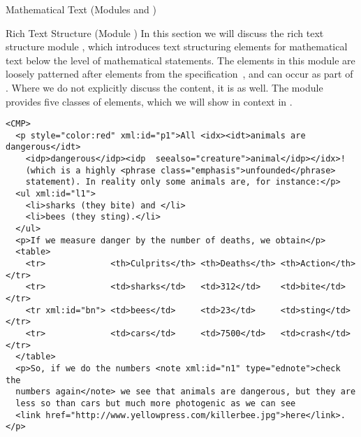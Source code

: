 \begin{tchapter}[id=mtxt,short=Mathematical Text]{Mathematical Text (Modules
  {} and {})}
\begin{tsection}[id=rt,short=Rich Text Structure]{Rich Text Structure (Module {})}
In this section we will discuss the {\omdoc} rich text structure module {},
which introduces text structuring elements for mathematical text below the level of
mathematical statements.  The elements in this module are loosely patterned after elements
from the {\xhtml} specification~\cite{W3C:xhtml2000}, and can occur as part of
{}.  Where we do not explicitly discuss the content, it
is {} as well. The module {} provides
five classes of elements, which we will show in context in {}.

\begin{lstlisting}[label=lst:richtext,
   caption={An Example of Rich Text Structure},
   index={CMP,ul,li,phrase,link}]
<CMP>
  <p style="color:red" xml:id="p1">All <idx><idt>animals are dangerous</idt>
    <idp>dangerous</idp><idp  seealso="creature">animal</idp></idx>!
    (which is a highly <phrase class="emphasis">unfounded</phrase> 
    statement). In reality only some animals are, for instance:</p>
  <ul xml:id="l1">
    <li>sharks (they bite) and </li>
    <li>bees (they sting).</li>
  </ul>
  <p>If we measure danger by the number of deaths, we obtain</p>
  <table>
    <tr>             <th>Culprits</th> <th>Deaths</th> <th>Action</th></tr>
    <tr>             <td>sharks</td>   <td>312</td>    <td>bite</td></tr>
    <tr xml:id="bn"> <td>bees</td>     <td>23</td>     <td>sting</td></tr>
    <tr>             <td>cars</td>     <td>7500</td>   <td>crash</td></tr>
  </table>
  <p>So, if we do the numbers <note xml:id="n1" type="ednote">check the
  numbers again</note> we see that animals are dangerous, but they are 
  less so than cars but much more photogenic as we can see
  <link href="http://www.yellowpress.com/killerbee.jpg">here</link>.</p>


\end{lstlisting}
\end{tsection}
\end{tchapter}
